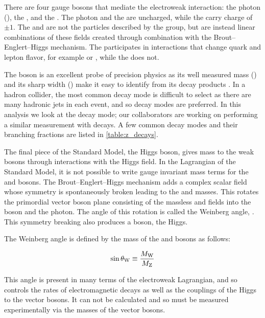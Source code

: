 There are four gauge bosons that mediate the electroweak interaction: the
photon (\photon), the \Z, and the \Wpm. The photon and the \Z are uncharged,
while the \Wpm carry charge of $\pm1$. The \W and \Z are not the particles
described by the \SUtwoUone group, but are instead linear combinations of these
fields created through combination with the Brout--Englert--Higgs mechanism.
The \W participates in interactions that change quark and lepton flavor, for
example \tWdecay or \mutoWnu, while the \Z does not.

The \Z boson is an excellent probe of precision physics as its well measured
mass (\Zmass) and its sharp width (\Zwidth) make it easy to identify from its
decay products \cite{pdg2014}. In a hadron collider, the most common \Ztoqq
decay mode is difficult to select as there are many hadronic jets in each
event, and so \Ztoll decay modes are preferred. In this analysis we look at the
\Ztoee decay mode; our collaborators are working on performing a similar
measurement with \Ztomumu decays. A few common decay modes and their branching
fractions are listed in \cref{table:z_decays}.



The final piece of the Standard Model, the Higgs boson, gives mass to the weak
bosons through interactions with the Higgs field. In the Lagrangian of the
Standard Model, it is not possible to write gauge invariant mass terms for the
\W and \Z bosons. The Brout--Englert--Higgs mechanism adds a complex scalar
field whose symmetry is spontaneously broken leading to the \W and \Z masses.
This rotates the primordial vector boson plane consisting of the massless
\PrimordialB and \PrimordialW fields into the \Z boson and the photon. The
angle of this rotation is called the Weinberg angle, \WeinbergAngle. This
symmetry breaking also produces a \spinzero boson, the Higgs.

The Weinberg angle is defined by the mass of the \Z and \W bosons as follows:

\begin{equation}
\label{eq:weinberg_angle}
    \sin \theta_{\text{W}} \equiv \frac{M_{\text{W}}}{M_{\text{Z}}}
\end{equation}

This angle is present in many terms of the electroweak Lagrangian, and so
controls the rates of electromagnetic decays as well as the couplings of the
Higgs to the vector bosons. It can not be calculated and so must be measured
experimentally via the masses of the vector bosons.

